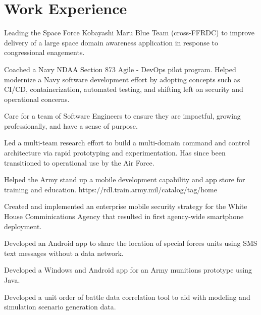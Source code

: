 \documentclass[]{deedy-resume-openfont}
\begin{document}
\section{Work Experience}
\hfill {}
\begin{tightemize}
	\item Leading the Space Force Kobayashi Maru Blue Team (cross-FFRDC) to improve delivery of a large space domain awareness application in response to congressional enagements.   
	\item Coached a Navy NDAA Section 873 Agile - DevOps pilot program. Helped modernize a Navy software development effort by adopting concepts such as CI/CD, containerization, automated testing, and shifting left on security and operational concerns.
\end{tightemize}
\sectionsep
{}\hfill {}
\begin{tightemize}
	\item Care for a team of Software Engineers to ensure they are impactful, growing professionally, and have a sense of purpose.
\end{tightemize}
\sectionsep
{}\hfill {}
\begin{tightemize}
	\item Led a multi-team research effort to build a multi-domain command and control architecture via rapid prototyping and experimentation. Has since been transitioned to operational use by the Air Force.
	\item Helped the Army stand up a mobile development capability and app store for training and education.  https://rdl.train.army.mil/catalog/tag/home
\end{tightemize}
\sectionsep
{}\hfill {}
\begin{tightemize}
	\item Created and implemented an enterprise mobile security strategy for the White House Comminications Agency that resulted in first agency-wide smartphone deployment.
	\item Developed an Android app to share the location of special forces units using SMS text messages without a data network. 
	\item Developed a Windows and Android app for an Army munitions prototype using Java.
\end{tightemize}
\sectionsep
{}\hfill {}
\begin{tightemize}
	\item Developed a unit order of battle data correlation tool to aid with modeling and simulation scenario generation data.
\end{tightemize}
\sectionsep
\end{document}

